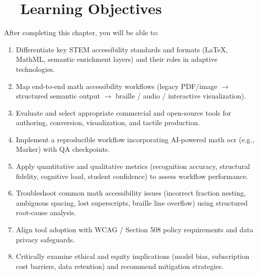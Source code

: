 \section{~~Learning Objectives}\label{ch11:sec:learning-objectives}
After completing this chapter, you will be able to:
\begin{enumerate}
	\item Differentiate key STEM accessibility standards and formats (LaTeX, \gls{MathML}, semantic enrichment layers) and their roles in adaptive technologies.\supercite{W3CMathML4}
	\item Map end-to-end math accessibility workflows (legacy PDF/image $\rightarrow$ structured semantic output $\rightarrow$ braille / audio / interactive visualization).
	\item Evaluate and select appropriate commercial and open-source tools for authoring, conversion, visualization, and tactile production.\supercite{Equatio, WIRISMathType, MathJax, Chirun}
	\item Implement a reproducible workflow incorporating AI-powered math \gls{ocr} (e.g., Marker) with QA checkpoints.\supercite{Marker, MarkerDocs}
	\item Apply quantitative and qualitative metrics (recognition accuracy, structural fidelity, cognitive load, student confidence) to assess workflow performance.
	\item Troubleshoot common math accessibility issues (incorrect fraction nesting, ambiguous spacing, lost superscripts, braille line overflow) using structured root-cause analysis.
	\item Align  tool adoption with WCAG / Section 508 policy requirements and data privacy safeguards.\supercite{WCAG21W3C2018, Section508, DataPrivacyAI}
	\item Critically examine ethical and equity implications (model bias, subscription cost barriers, data retention) and recommend mitigation strategies.\supercite{AI_Ethics_Bias, Bias_in_AI}
\end{enumerate}

